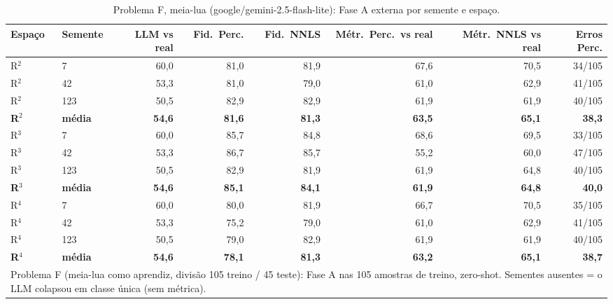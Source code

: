 \begin{table}[htbp]
\centering
\small
\caption{Problema F, meia-lua (google/gemini-2.5-flash-lite): Fase A externa por semente e espaço.}
\label{tab:bloco2_F_meialua_faseA_R2_R3_R4_flashlite}
\begin{tabular}{llrrrrrr}
\toprule
Espaço & Semente & LLM vs real & Fid.\ Perc. & Fid.\ NNLS & Métr.\ Perc.\ vs real & Métr.\ NNLS vs real & Erros Perc. \\
\midrule
R$^2$ & 7 & 60,0 & 81,0 & 81,9 & 67,6 & 70,5 & 34/105 \\
R$^2$ & 42 & 53,3 & 81,0 & 79,0 & 61,0 & 62,9 & 41/105 \\
R$^2$ & 123 & 50,5 & 82,9 & 82,9 & 61,9 & 61,9 & 40/105 \\
\textbf{R$^2$} & \textbf{média} & \textbf{54,6} & \textbf{81,6} & \textbf{81,3} & \textbf{63,5} & \textbf{65,1} & \textbf{38,3} \\
\midrule
R$^3$ & 7 & 60,0 & 85,7 & 84,8 & 68,6 & 69,5 & 33/105 \\
R$^3$ & 42 & 53,3 & 86,7 & 85,7 & 55,2 & 60,0 & 47/105 \\
R$^3$ & 123 & 50,5 & 82,9 & 81,9 & 61,9 & 64,8 & 40/105 \\
\textbf{R$^3$} & \textbf{média} & \textbf{54,6} & \textbf{85,1} & \textbf{84,1} & \textbf{61,9} & \textbf{64,8} & \textbf{40,0} \\
\midrule
R$^4$ & 7 & 60,0 & 80,0 & 81,9 & 66,7 & 70,5 & 35/105 \\
R$^4$ & 42 & 53,3 & 75,2 & 79,0 & 61,0 & 62,9 & 41/105 \\
R$^4$ & 123 & 50,5 & 79,0 & 82,9 & 61,9 & 61,9 & 40/105 \\
\textbf{R$^4$} & \textbf{média} & \textbf{54,6} & \textbf{78,1} & \textbf{81,3} & \textbf{63,2} & \textbf{65,1} & \textbf{38,7} \\
\bottomrule
\multicolumn{8}{p{0.95\linewidth}}{\footnotesize Problema F (meia-lua como aprendiz, divisão 105 treino / 45 teste): Fase A nas 105 amostras de treino, zero-shot. Sementes ausentes = o LLM colapsou em classe única (sem métrica).} \\
\end{tabular}
\end{table}
